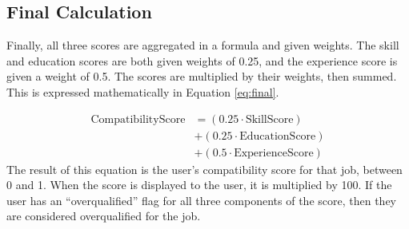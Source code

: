 \documentclass{article}
\begin{document}
\subsection{Final Calculation}

Finally, all three scores are aggregated in a formula and given weights. The skill and education scores are both given weights of 0.25, and the experience score is given a weight of 0.5. The scores are multiplied by their weights, then summed. This is expressed mathematically in Equation \ref{eq:final}.

\begin{equation}
\begin{split}
    \text{CompatibilityScore} &= (0.25\cdot\text{SkillScore}) \\
    &+ (0.25\cdot\text{EducationScore}) \\
    &+ (0.5\cdot\text{ExperienceScore})
    \label{eq:final}
\end{split}
\end{equation}
The result of this equation is the user's compatibility score for that job, between 0 and 1. When the score is displayed to the user, it is multiplied by 100. If the user has an ``overqualified'' flag for all three components of the score, then they are considered overqualified for the job.
\end{document}
